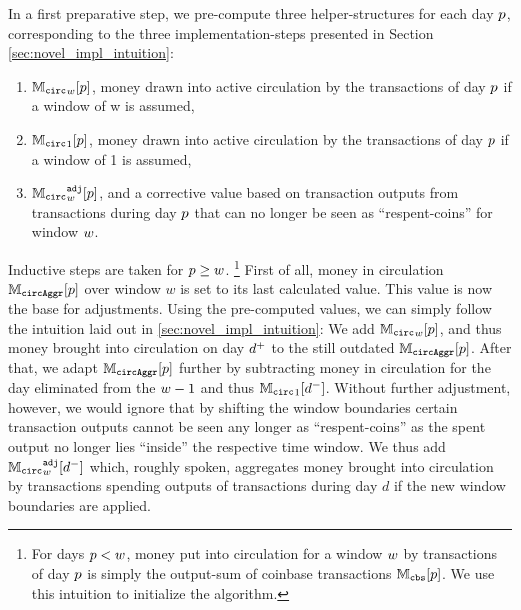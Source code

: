 In a first preparative step, we pre-compute three helper-structures for each day \({p}\), corresponding to the three implementation-steps presented in Section \ref{sec:novel_impl_intuition}:
\begin{enumerate}
\item \( {{\mathbb{M}_{\mathtt{circ}}}_{{w}}}[{p}] \), money drawn into active circulation by the transactions of day \({p}\) if a window of w is assumed,
\item \( {\mathbb{M}_{\mathtt{circ}}}_{1}[{p}] \), money drawn into active circulation by the transactions of day \( {p} \) if a window of 1 is assumed,
\item \( {{\mathbb{M}_{\mathtt{circ}}}^{\mathtt{adj}}_{{w}}}[{p}] \), and a corrective value based on transaction outputs from transactions during day \({p}\) that can no longer be seen as ``respent-coins'' for window \({w}\).  
\end{enumerate}
Inductive steps are taken for \({p} \geq {w} \).%
\footnote{
For days \({p} < {w} \), money put into circulation for a window \({w}\) by transactions of day \({p}\) is simply the output-sum of coinbase transactions \({\mathbb{M}_{{\mathtt{cbs}}}}[{p}]\). %
We use this intuition to initialize the algorithm.} %
First of all, money in circulation \({\mathbb{M}_{\mathtt{circAggr}}}[{p}]\) over window \(w\) is set to its last calculated value. %
This value is now the base for adjustments. %
Using the pre-computed values, we can simply follow the intuition laid out in \ref{sec:novel_impl_intuition}: %
We add \({{\mathbb{M}_{\mathtt{circ}}}_{{w}}}[{p}]\), and thus money brought into circulation on day \({d^{+}}\) to the still outdated \({\mathbb{M}_{\mathtt{circAggr}}}[{p}]\). %
After that, we adapt \({\mathbb{M}_{\mathtt{circAggr}}}[{p}]\) further by subtracting money in circulation for the day eliminated from the \({w} - 1\) and thus \({\mathbb{M}_{\mathtt{circ}}}_{1}[{d^{-}}]\). %
Without further adjustment, however, we would ignore that by shifting the window boundaries certain transaction outputs cannot be seen any longer as ``respent-coins'' as the spent output no longer lies ``inside'' the respective time window. %
We thus add \( {{\mathbb{M}_{\mathtt{circ}}}^{\mathtt{adj}}_{{w}}}[{d^{-}}] \) which, roughly spoken, aggregates money brought into circulation by transactions spending outputs of transactions during day \(d\) if the new window boundaries are applied. %



